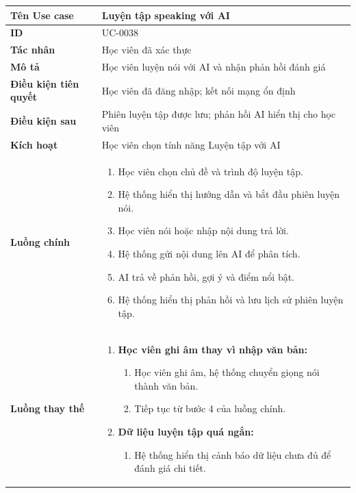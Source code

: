 {
\renewcommand{\arraystretch}{1.5}

\begin{tabularx}{\textwidth}{|>{\raggedright\arraybackslash}X|>{\raggedright\arraybackslash}X|}
\hline
\textbf{Tên Use case} & Luyện tập speaking với AI \\
\hline
\textbf{ID} & UC-0038 \\
\hline
\textbf{Tác nhân} & Học viên đã xác thực \\
\hline
\textbf{Mô tả} & Học viên luyện nói với AI và nhận phản hồi đánh giá \\
\hline
\textbf{Điều kiện tiên quyết} & Học viên đã đăng nhập; kết nối mạng ổn định \\
\hline
\textbf{Điều kiện sau} & Phiên luyện tập được lưu; phản hồi AI hiển thị cho học viên \\
\hline
\textbf{Kích hoạt} & Học viên chọn tính năng Luyện tập với AI \\
\hline
\textbf{Luồng chính} &
\begin{enumerate}
    \item Học viên chọn chủ đề và trình độ luyện tập.
    \item Hệ thống hiển thị hướng dẫn và bắt đầu phiên luyện nói.
    \item Học viên nói hoặc nhập nội dung trả lời.
    \item Hệ thống gửi nội dung lên AI để phân tích.
    \item AI trả về phản hồi, gợi ý và điểm nổi bật.
    \item Hệ thống hiển thị phản hồi và lưu lịch sử phiên luyện tập.
\end{enumerate} \\
\hline
\textbf{Luồng thay thế} &
\begin{enumerate}
    \item \textbf{Học viên ghi âm thay vì nhập văn bản:}
    \begin{enumerate}
        \item[3A.] Học viên ghi âm, hệ thống chuyển giọng nói thành văn bản.
        \item[4A.] Tiếp tục từ bước 4 của luồng chính.
    \end{enumerate}
    \item \textbf{Dữ liệu luyện tập quá ngắn:}
    \begin{enumerate}
        \item[5B.] Hệ thống hiển thị cảnh báo dữ liệu chưa đủ để đánh giá chi tiết.
    \end{enumerate}

\end{enumerate}
\end{tabularx}}
